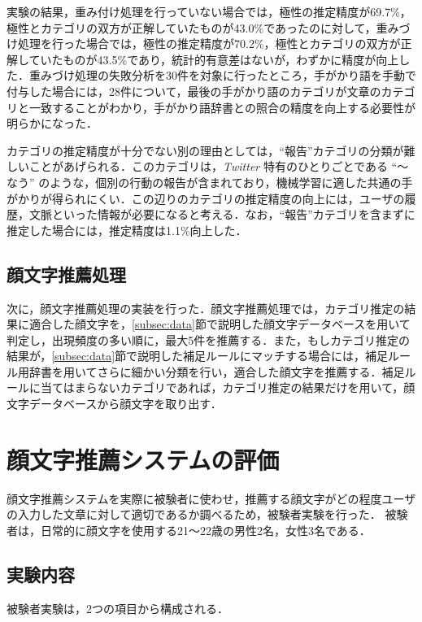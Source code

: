 \documentclass[japanese]{jnlp_1.4}
\begin{document}
実験の結果，重み付け処理を行っていない場合では，極性の推定精度が69.7\%，極性とカテゴリの双方が正解していたものが43.0\%であったのに対して，重みづけ処理を行った場合では，極性の推定精度が70.2\%，極性とカテゴリの双方が正解していたものが43.5\%であり，統計的有意差はないが，わずかに精度が向上した．重みづけ処理の失敗分析を30件を対象に行ったところ，手がかり語を手動で付与した場合には，28件について，最後の手がかり語のカテゴリが文章のカテゴリと一致することがわかり，手がかり語辞書との照合の精度を向上する必要性が明らかになった．

カテゴリの推定精度が十分でない別の理由としては，``報告''カテゴリの分類が難しいことがあげられる．このカテゴリは，{\it Twitter} 特有のひとりごとである ``〜なう'' のような，個別の行動の報告が含まれており，機械学習に適した共通の手がかりが得られにくい．この辺りのカテゴリの推定精度の向上には，ユーザの履歴，文脈といった情報が必要になると考える．なお，\mbox{``報}告''カテゴリを含まずに推定した場合には，推定精度は1.1\%向上した．


\subsection{顔文字推薦処理}
\label{subsec:recommend}

次に，顔文字推薦処理の実装を行った．顔文字推薦処理では，カテゴリ推定の結果に適合した顔文字を，\ref{subsec:data}節で説明した顔文字データベースを用いて判定し，出現頻度の多い順に，最大5件を推薦する．また，もしカテゴリ推定の結果が，\ref{subsec:data}節で説明した補足ルールにマッチする場合には，補足ルール用辞書を用いてさらに細かい分類を行い，適合した顔文字を推薦する．補足ルールに当てはまらないカテゴリであれば，カテゴリ推定の結果だけを用いて，顔文字データベースから顔文字を取り出す．


\section{顔文字推薦システムの評価}
\label{sec:evaluation}

顔文字推薦システムを実際に被験者に使わせ，推薦する顔文字がどの程度ユーザの入力した文章に対して適切であるか調べるため，被験者実験を行った．
被験者は，日常的に顔文字を使用する21〜22歳の男性2名，女性3名である．

\subsection{実験内容}

被験者実験は，2つの項目から構成される．
\end{document}
